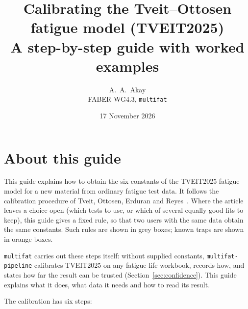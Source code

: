 \documentclass[11pt,a4paper]{article}
\title{Calibrating the Tveit--Ottosen fatigue model (TVEIT2025)\\[4pt]
  \large A step-by-step guide with worked examples}
\author{A.~A.~Akay\\ \small FABER WG4.3, \texttt{multifat}}
\date{17 November 2026}
\newcommand{\code}[1]{\texttt{#1}}
\begin{document}
\maketitle

\section{About this guide}
This guide explains how to obtain the six constants of the TVEIT2025 fatigue model for a new material from ordinary
fatigue test data. It follows the calibration procedure of Tveit, Ottosen, Erduran and Reyes~\cite{tveit2025}.
Where the article leaves a choice open (which tests to use, or which of several equally good fits to keep), this
guide gives a fixed rule, so that two users with the same data obtain the same constants. Such rules are shown in
grey boxes; known traps are shown in orange boxes.

\texttt{multifat} carries out these steps itself: without supplied constants, \code{multifat-pipeline} calibrates
TVEIT2025 on any fatigue-life workbook, records how, and states how far the result can be trusted
(Section~\ref{sec:confidence}). This guide explains what it does, what data it needs and how to read its result.

The calibration has six steps:
\end{document}
